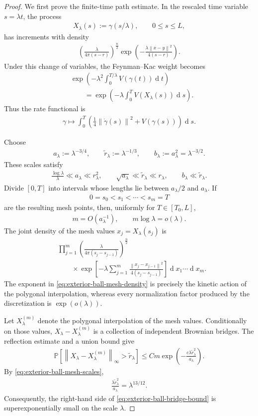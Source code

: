 \documentclass[a4paper,10pt]{article}
\numberwithin{equation}{section}
\theoremstyle{plain}
\theoremstyle{plain}
\theoremstyle{plain}
\theoremstyle{plain}
\theoremstyle{plain}
\theoremstyle{remark}
\theoremstyle{definition}
\newcommand{\PP}{\mathbb{P}}
\newcommand\norm[1]{\left\lVert#1\right\rVert}
\newcommand{\dif}{\operatorname{d}\!} %
\newcommand{\eq}[1]{\begin{align*}#1\end{align*}}
\newcommand{\eql}[1]{\begin{align}#1\end{align}}
\newcommand{\br}[1]{\left(#1\right)}
\begin{document}
\begin{proof}
We first prove the finite-time path estimate. In the rescaled time
variable $s=\lambda t$, the process
\eq{
X_\lambda(s)
:=
\gamma(s/\lambda),
\qquad
0\leq s\leq L,
}
has increments with density
\eq{
\left(
\frac{\lambda}{4\pi(s-r)}
\right)^{\frac n2}
\exp\left(
-\frac{\lambda\norm{x-y}^2}
{4(s-r)}
\right).
}
Under this change of variables, the Feynman--Kac weight becomes
\eql{
&\exp\left(
-\lambda^2
\int_0^{T/\lambda}
V\br{\gamma(t)}
\dif{t}
\right)
\nonumber\\
&\qquad=
\exp\left(
-\lambda
\int_0^T
V\br{X_\lambda(s)}
\dif{s}
\right).
\label{eq:exterior-ball-rescaled-feynman-kac}
}
Thus the rate functional is
\eq{
\gamma
\longmapsto
\int_0^T
\left(
\frac14
\norm{\dot\gamma(s)}^2
+
V\br{\gamma(s)}
\right)
\dif{s}.
}

Choose
\eq{
a_\lambda
:=
\lambda^{-3/4},
\qquad
\widetilde r_\lambda
:=
\lambda^{-1/3},
\qquad
b_\lambda
:=
a_\lambda^2
=
\lambda^{-3/2}.
}
These scales satisfy
\eql{
\frac{\log\lambda}{\lambda}
\ll
a_\lambda
\ll
r_\lambda^2,
\qquad
\sqrt{a_\lambda}
\ll
\widetilde r_\lambda
\ll
r_\lambda,
\qquad
b_\lambda
\ll
\widetilde r_\lambda.
\label{eq:exterior-ball-mesh-scales}
}
Divide $[0,T]$ into intervals whose lengths lie between
$a_\lambda/2$ and $a_\lambda$. If
\eq{
0=s_0<s_1<\cdots<s_m=T
}
are the resulting mesh points, then, uniformly for
$T\in[T_0,L]$,
\eq{
m=O(a_\lambda^{-1}),
\qquad
m\log\lambda=o(\lambda).
}
The joint density of the mesh values
$x_j=X_\lambda(s_j)$ is
\eql{
&\prod_{j=1}^m
\left(
\frac{\lambda}
{4\pi(s_j-s_{j-1})}
\right)^{\frac n2}
\nonumber\\
&\qquad\times
\exp\left[
-\lambda
\sum_{j=1}^m
\frac{
\norm{x_j-x_{j-1}}^2
}{
4(s_j-s_{j-1})
}
\right]
\dif{x_1}
\cdots
\dif{x_m}.
\label{eq:exterior-ball-mesh-density}
}
The exponent in
\cref{eq:exterior-ball-mesh-density} is precisely the kinetic action
of the polygonal interpolation, whereas every normalization factor
produced by the discretization is $\exp(o(\lambda))$.

Let $X_\lambda^{(m)}$ denote the polygonal interpolation of the mesh
values. Conditionally on those values,
$X_\lambda-X_\lambda^{(m)}$ is a collection of independent Brownian
bridges. The reflection estimate and a union bound give
\eql{
\PP\left[
\norm{
X_\lambda-X_\lambda^{(m)}
}_\infty
>
\widetilde r_\lambda
\right]
\leq
Cm
\exp\left(
-\frac{
c\lambda\widetilde r_\lambda^2
}{
a_\lambda
}
\right).
\label{eq:exterior-ball-bridge-bound}
}
By \cref{eq:exterior-ball-mesh-scales},
\eq{
\frac{
\lambda\widetilde r_\lambda^2
}{
a_\lambda
}
=
\lambda^{13/12}.
}
Consequently, the right-hand side of
\cref{eq:exterior-ball-bridge-bound} is superexponentially small on
the scale $\lambda$.


\end{proof}
\end{document}
